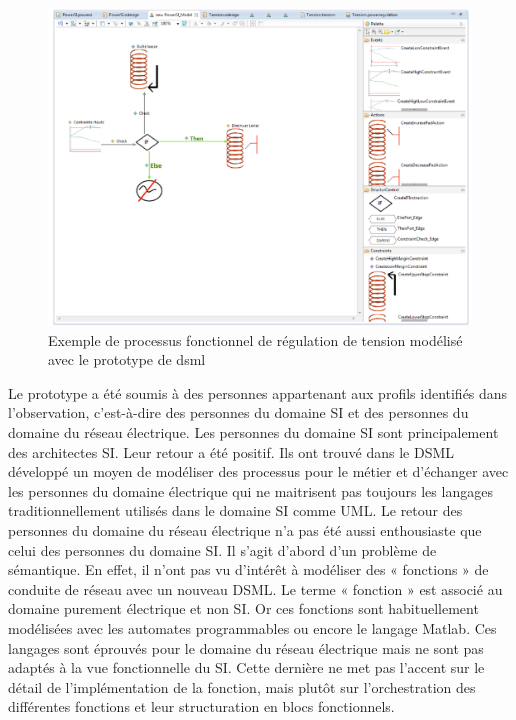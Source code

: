 \begin{figure}[!ht]
  \centering
  \includegraphics[trim = 0cm 0cm 0cm 0cm, clip, width=1\textwidth]{figures/6_methodologie/proto_dsml.pdf}
 \caption{Exemple de processus fonctionnel de régulation de tension modélisé avec le prototype de \gls{dsml}}
 \label{fig:proto_dsml}
\end{figure} 

Le prototype a été soumis à des personnes appartenant aux profils identifiés
dans l'observation, c'est-à-dire des personnes du domaine SI et des personnes du
domaine du réseau électrique. Les personnes du domaine SI sont principalement
des architectes SI. Leur retour a été positif. Ils ont trouvé dans le DSML
développé un moyen de modéliser des processus pour le métier et d'échanger avec
les personnes du domaine électrique qui ne maitrisent pas toujours les langages
traditionnellement utilisés dans le domaine SI comme UML. Le retour des
personnes du domaine du réseau électrique n'a pas été aussi enthousiaste que
celui des personnes du domaine SI. Il s'agit d'abord d'un problème de
sémantique. En effet, il n'ont pas vu d'intérêt à modéliser des « fonctions » de
conduite de réseau avec un nouveau DSML. Le terme « fonction » est associé au
domaine purement électrique et non SI. Or ces fonctions sont habituellement
modélisées avec les automates programmables ou encore le langage Matlab. Ces
langages sont éprouvés pour le domaine du réseau électrique mais ne sont pas
adaptés à la vue fonctionnelle du SI. Cette dernière ne met pas l'accent sur le
détail de l'implémentation de la fonction, mais plutôt sur l'orchestration des
différentes fonctions et leur structuration en blocs fonctionnels.

